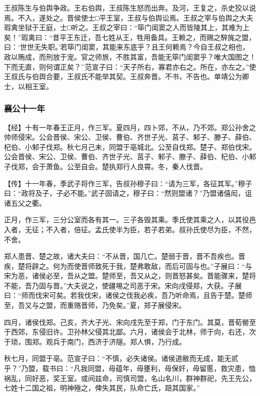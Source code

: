 \documentclass[]{article}
\begin{document}
王叔陈生与伯舆争政。王右伯舆，王叔陈生怒而出奔。及河，王复之，杀史狡以说焉。不入，遂处之。晋侯使士□平王室，王叔与伯舆讼焉。王叔之宰与伯舆之大夫瑕禽坐狱于王庭，士□听之。王叔之宰曰：``筚门闺窦之人而皆陵其上，其难为上矣！''瑕禽曰：``昔平王东迁，吾七姓从王，牲用备具。王赖之，而赐之騂旄之盟，曰：`世世无失职。'若筚门闺窦，其能来东底乎？且王何赖焉？今自王叔之相也，政以贿成，而刑放于宠。官之师旅，不胜其富，吾能无筚门闺窦乎？唯大国图之！下而无直，则何谓正矣？''范宣子曰：``天子所右，寡君亦右之。所在，亦左之。''使王叔氏与伯舆合要，王叔氏不能举其契。王叔奔晋。不书，不告也。单靖公为卿士，以相王室。

\hypertarget{header-n1952}{%
\subsubsection{襄公十一年}\label{header-n1952}}

【经】十有一年春王正月，作三军。夏四月，四卜郊，不从，乃不郊。郑公孙舍之帅师侵宋。公会晋侯、宋公、卫侯、曹伯、齐世子光、莒子、邾子、滕子、薛伯、杞伯、小邾子伐郑。秋七月己未，同盟于亳城北。公至自伐郑。楚子、郑伯伐宋。公会晋侯、宋公、卫侯、曹伯、齐世子光、莒子、邾子、滕子、薛伯、杞伯、小邾子伐郑，会于萧鱼。公至自会。楚执郑行人良霄。冬，秦人伐晋。

【传】十一年春，季武子将作三军，告叔孙穆子曰：``请为三军，各征其军。''穆子曰：``政将及子，子必不能。''武子固请之，穆子曰：``然则盟诸？''乃盟诸僖闳，诅诸五父之衢。

正月，作三军，三分公室而各有其一。三子各毁其乘。季氏使其乘之人，以其役邑入者，无征；不入者，倍征。孟氏使半为臣，若子若弟。叔孙氏使尽为臣，不然，不舍。

郑人患晋、楚之故，诸大夫曰：``不从晋，国几亡。楚弱于晋，晋不吾疾也。晋疾，楚将辟之。何为而使晋师致死于我，楚弗敢敌，而后可固与也。''子展曰：``与宋为恶，诸侯必至，吾从之盟。楚师至，吾又从之，则晋怒甚矣。晋能骤来，楚将不能，吾乃固与晋。''大夫说之，使疆埸之司恶于宋。宋向戌侵郑，大获。子展曰：``师而伐宋可矣。若我伐宋，诸侯之伐我必疾，吾乃听命焉，且告于楚。楚师至，吾又与之盟，而重赂晋师，乃免矣。''夏，郑子展侵宋。

四月，诸侯伐郑。己亥，齐大子光、宋向戌先至于郑，门于东门。其莫，晋荀罃至于西郊，东侵旧许。卫孙林父侵其北鄙。六月，诸侯会于北林，师于向，右还，次于琐，围郑。观兵于南门，西济于济隧。郑人惧，乃行成。

秋七月，同盟于亳。范宣子曰：``不慎，必失诸侯。诸侯道敝而无成，能无贰乎？''乃盟，载书曰：``凡我同盟，毋蕴年，毋壅利，毋保奸，毋留慝，救灾患，恤祸乱，同好恶，奖王室。或间兹命，司慎司盟，名山名川，群神群祀，先王先公，七姓十二国之祖，明神殛之，俾失其民，队命亡氏，踣其国家。''
\end{document}

